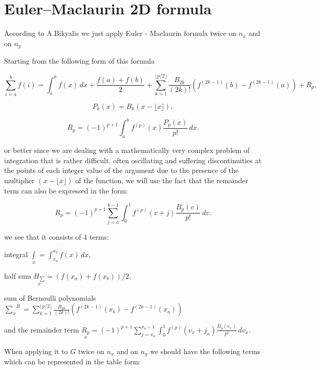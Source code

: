 \documentclass[11pt]{article}
\begin{document}
\section{Euler--Maclaurin 2D formula}\label{eulermaclaurin-2d-formula}

According to A.Bikyalis \cite{Bikyalis1968} we just apply Euler -
Maclaurin formula twice on \(n_x\) and on \(n_y\)

Starting from the following form of this formula

\[{\displaystyle \sum _{i=a}^{b}f(i)=\int _{a}^{b}f(x)\,dx+{\frac {f(a)+f(b)}{2}}+\sum _{k=1}^{\lfloor p/2\rfloor }{\frac {B_{2k}}{(2k)!}}\left(f^{(2k-1)}(b)-f^{(2k-1)}(a)\right)+R_{p},}\]

\[{\displaystyle P_{k}(x)=B_{k}\left(x-\lfloor x\rfloor \right),}\]

\[{\displaystyle R_{p}=(-1)^{p+1}\int _{a}^{b}f^{(p)}(x){\frac {P_{p}(x)}{p!}}\,dx.}\]

or better since we are dealing with a mathematically very complex
problem of integration that is rather difficult, often oscillating and
suffering discontinuities at the points of each integer value of the
argument due to the presence of the multiplier \((x-\lfloor x\rfloor )\)
of the function, we will use the fact that the remainder term can also
be expressed in the form:

\[{\displaystyle R_{p}=(-1)^{p+1}\sum_{j=a}^{b-1} \int _{0}^{1}f^{(p)}(v+j){\frac {B_{p}(v)}{p!}}\,dv.}\]

we see that it consists of 4 terms:

integral \(\int\limits_{x}^{}=\int _{x_a}^{x_b}f(x)\,dx\),

half sum \(\underset{x}{H_{\sum}}={\left( {f(x_a)+f(x_b)}\right)/{2}}\),

sum of Bernoulli polynomials
\({\sum\limits_{x}^{}}^{B}=\sum _{k=1}^{\lfloor p/2\rfloor }{\frac {B_{2k}}{(2k)!}}\left(f^{(2k-1)}(x_b)-f^{(2k-1)}(x_a)\right)\)

and the remainder term
\(\underset{x}{R_{p}}=(-1)^{p+1}\sum_{j=x_a}^{x_b-1} \int _{0}^{1}f^{(p)}(v_x+j_x){\frac {B_{p}(v_x)}{p!}}\,dv_x\).

When applying it to \(G\) twice on \(n_x\) and on \(n_y\) we should have
the following terms which can be represented in the table form:
\end{document}
